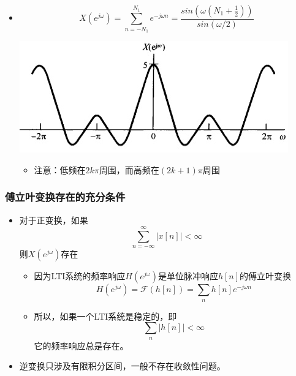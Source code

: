 \documentclass[CJKutf8,xcolor=pdftex,dvipsnames,table]{beamer}
\begin{document}
\begin{CJK*}{UTF8}{song}
\begin{frame}
\begin{itemize}
    \item
    \[
    X(e^{j\omega}) = \sum_{n=-N_1}^{N_1}e^{-j\omega n} = \frac{sin(\omega (N_1 + \frac{1}{2}))}{sin(\omega /2)}
    \]
    	\begin{center}
    	\includegraphics[scale=.5]{ss-c-f5-6b}
    	\end{center}    
		\begin{itemize}
		\item 注意：低频在$2k\pi$周围，而高频在$(2k+1)\pi$周围
		\end{itemize}
    \end{itemize}

  \end{frame}  
  
  \begin{frame}
    \frametitle{傅立叶变换存在的充分条件}
    \begin{itemize}
    \item 对于正变换，如果
    \[
    	 \sum_{n=-\infty}^{\infty}|x[n]| < \infty
    \]
    则$X(e^{j\omega})$存在
    	\begin{itemize}
		\item 因为LTI系统的频率响应$H(e^{j\omega})$是单位脉冲响应$h[n]$的傅立叶变换
		\[
			H(e^{j\omega})=\mathscr{F}(h[n])=\sum_n h[n]e^{-j\omega n}
		\]   
		\item 所以，如果一个LTI系统是稳定的，即
		\[
			\sum_n|h[n]| < \infty
		\]
		它的频率响应总是存在。		
		\end{itemize}
    \item 逆变换只涉及有限积分区间，一般不存在收敛性问题。
    
 
    \end{itemize}

  \end{frame} 
        

\end{CJK*}
\end{document}
